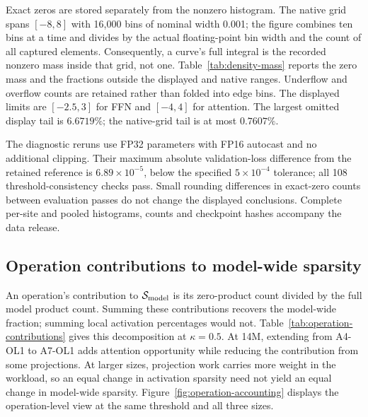 Exact zeros are stored separately from the nonzero histogram. The native
grid spans $[-8,8]$ with 16,000 bins of nominal width 0.001; the figure
combines ten bins at a time and divides by the actual floating-point bin
width and the count of all captured elements. Consequently, a curve's full
integral is the recorded nonzero mass inside that grid, not one. Table~\ref{tab:density-mass}
reports the zero mass and the fractions outside the displayed and native
ranges. Underflow and overflow counts are retained rather than folded into
edge bins. The displayed limits are $[-2.5,3]$ for FFN and $[-4,4]$ for
attention. The largest omitted display tail is $6.6719\%$; the native-grid
tail is at most $0.7607\%$.

The diagnostic reruns use FP32 parameters with FP16 autocast and no
additional clipping. Their maximum absolute validation-loss difference
from the retained reference is $6.89\times10^{-5}$, below the specified
$5\times10^{-4}$ tolerance; all 108 threshold-consistency checks pass. Small
rounding differences in exact-zero counts between evaluation passes do not
change the displayed conclusions. Complete per-site and pooled histograms,
counts and checkpoint hashes accompany the data release.

\begin{table}[htbp]
\centering\small
\caption{Activation sparsity (the probability mass at zero) omitted from the
density curves, and mass outside their
displayed range (view tail) and the native $[-8,8]$ histogram (grid tail).
Grid tails are a subset of view tails, not an additional mass to add.
All percentages divide integer counts by all captured elements. A0 is
listed once although it is repeated in each figure row. These 14 groups
come from seven checkpoints.}
\label{tab:density-mass}

\end{table}

\FloatBarrier
\subsection{Operation contributions to model-wide sparsity}
\label{app:operation-results}

An operation's contribution to $\mathcal{S}_{\mathrm{model}}$ is its zero-product count divided
by the full model product count. Summing these contributions recovers the
model-wide fraction; summing local activation percentages would not.
Table~\ref{tab:operation-contributions} gives this decomposition at
$\kappa=0.5$. At 14M, extending from A4-OL1 to A7-OL1 adds attention
opportunity while reducing the contribution from some projections.
At larger sizes, projection work carries more weight in the workload, so
an equal change in activation sparsity need not yield an equal change in
model-wide sparsity. Figure~\ref{fig:operation-accounting} displays the
operation-level view at the same threshold and all three sizes.

